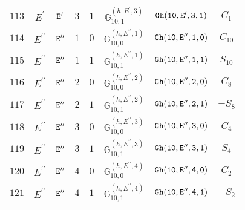 \documentclass[fleqn,8pt]{jsarticle}
\begin{document}
\begin{table}[ht!]
\begin{center}
\begin{tabular}{cccccccc}
$ 113 $ & $ E^{\prime} $ & $ {\tt E'} $ & $ 3 $ & $ 1 $ & $ \mathbb{G}_{10,1}^{(h,E^{\prime},3)} $ & $ {\tt Gh(10,E',3,1)} $ & $ C_{1} $ \\
$ 114 $ & $ E^{\prime\prime} $ & $ {\tt E''} $ & $ 1 $ & $ 0 $ & $ \mathbb{G}_{10,0}^{(h,E^{\prime\prime},1)} $ & $ {\tt Gh(10,E'',1,0)} $ & $ C_{10} $ \\
$ 115 $ & $ E^{\prime\prime} $ & $ {\tt E''} $ & $ 1 $ & $ 1 $ & $ \mathbb{G}_{10,1}^{(h,E^{\prime\prime},1)} $ & $ {\tt Gh(10,E'',1,1)} $ & $ S_{10} $ \\
$ 116 $ & $ E^{\prime\prime} $ & $ {\tt E''} $ & $ 2 $ & $ 0 $ & $ \mathbb{G}_{10,0}^{(h,E^{\prime\prime},2)} $ & $ {\tt Gh(10,E'',2,0)} $ & $ C_{8} $ \\
$ 117 $ & $ E^{\prime\prime} $ & $ {\tt E''} $ & $ 2 $ & $ 1 $ & $ \mathbb{G}_{10,1}^{(h,E^{\prime\prime},2)} $ & $ {\tt Gh(10,E'',2,1)} $ & $ - S_{8} $ \\
$ 118 $ & $ E^{\prime\prime} $ & $ {\tt E''} $ & $ 3 $ & $ 0 $ & $ \mathbb{G}_{10,0}^{(h,E^{\prime\prime},3)} $ & $ {\tt Gh(10,E'',3,0)} $ & $ C_{4} $ \\
$ 119 $ & $ E^{\prime\prime} $ & $ {\tt E''} $ & $ 3 $ & $ 1 $ & $ \mathbb{G}_{10,1}^{(h,E^{\prime\prime},3)} $ & $ {\tt Gh(10,E'',3,1)} $ & $ S_{4} $ \\
$ 120 $ & $ E^{\prime\prime} $ & $ {\tt E''} $ & $ 4 $ & $ 0 $ & $ \mathbb{G}_{10,0}^{(h,E^{\prime\prime},4)} $ & $ {\tt Gh(10,E'',4,0)} $ & $ C_{2} $ \\
$ 121 $ & $ E^{\prime\prime} $ & $ {\tt E''} $ & $ 4 $ & $ 1 $ & $ \mathbb{G}_{10,1}^{(h,E^{\prime\prime},4)} $ & $ {\tt Gh(10,E'',4,1)} $ & $ - S_{2} $ \\
 \hline \hline
\end{tabular}
\end{center}
\end{table}
\end{document}
